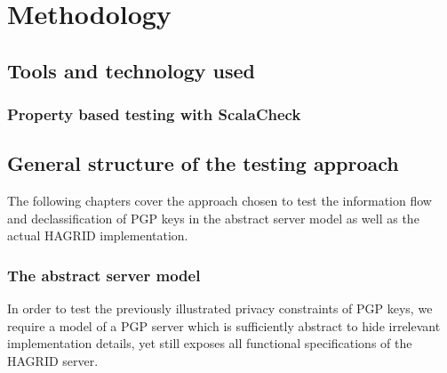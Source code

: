 \section{Methodology}
\subsection{Tools and technology used}
\newpage
\subsubsection{Property based testing with ScalaCheck}
\newpage
\subsection{General structure of the testing approach}
The following chapters cover the approach chosen to test the information flow and declassification of PGP keys in the abstract server model as well as the actual HAGRID implementation. 

\subsubsection{The abstract server model}
In order to test the previously illustrated privacy constraints of PGP keys, we require a model of a PGP server which is sufficiently abstract to hide irrelevant implementation details, yet still exposes all functional specifications of the HAGRID server.

